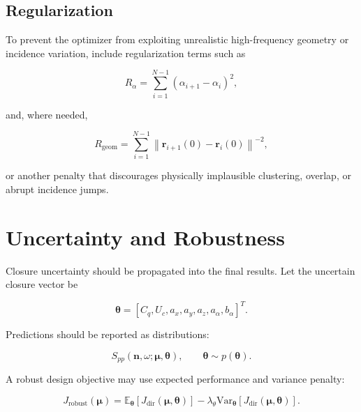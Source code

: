 \documentclass[11pt]{article}
\newcommand{\vect}[1]{\bm{#1}}
\newcommand{\E}{\mathbb{E}}
\begin{document}
\subsection{Regularization}

To prevent the optimizer from exploiting unrealistic high-frequency geometry or incidence variation, include regularization terms such as

\begin{equation}
    R_{\alpha}
    =
    \sum_{i=1}^{N-1}
    \left(
        \alpha_{i+1}-\alpha_i
    \right)^2,
\end{equation}

and, where needed,

\begin{equation}
    R_{\mathrm{geom}}
    =
    \sum_{i=1}^{N-1}
    \left\|
        \vect{r}_{i+1}(0)-\vect{r}_{i}(0)
    \right\|^{-2},
\end{equation}

or another penalty that discourages physically implausible clustering, overlap, or abrupt incidence jumps.

\section{Uncertainty and Robustness}

Closure uncertainty should be propagated into the final results. Let the uncertain closure vector be

\begin{equation}
    \vect{\theta}
    =
    \left[
        C_q,
        U_c,
        a_x,
        a_y,
        a_z,
        a_{\alpha},
        b_{\alpha}
    \right]^T.
\end{equation}

Predictions should be reported as distributions:

\begin{equation}
    S_{pp}(\vect{n},\omega;\vect{\mu},\vect{\theta}),
    \qquad
    \vect{\theta}\sim p(\vect{\theta}).
\end{equation}

A robust design objective may use expected performance and variance penalty:

\begin{equation}
    J_{\mathrm{robust}}(\vect{\mu})
    =
    \E_{\vect{\theta}}
    \left[
        J_{\mathrm{dir}}(\vect{\mu},\vect{\theta})
    \right]
    -
    \lambda_{\theta}
    \mathrm{Var}_{\vect{\theta}}
    \left[
        J_{\mathrm{dir}}(\vect{\mu},\vect{\theta})
    \right].
\end{equation}
\end{document}
